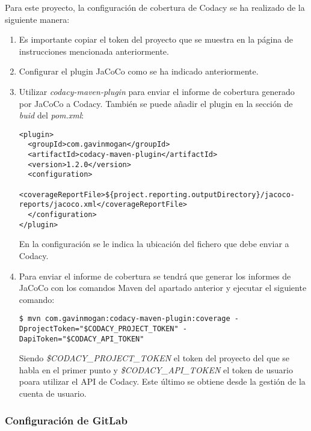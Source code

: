 Para este proyecto, la configuración de cobertura de Codacy se ha realizado de la siguiente manera:
\begin{enumerate}
	\item Es importante copiar el token del proyecto que se muestra en la página de instrucciones mencionada anteriormente. 
	
	\item Configurar el plugin JaCoCo como se ha indicado anteriormente.
	
	\item Utilizar \textit{codacy-maven-plugin} para enviar el informe de cobertura generado por JaCoCo a Codacy. También se puede añadir el plugin en la sección de \textit{buid} del \textit{pom.xml}:\\
\begin{minipage}{\linewidth}
{\tiny
\begin{lstlisting}[breaklines]
<plugin>
  <groupId>com.gavinmogan</groupId>
  <artifactId>codacy-maven-plugin</artifactId>
  <version>1.2.0</version>
  <configuration>
	<coverageReportFile>${project.reporting.outputDirectory}/jacoco-reports/jacoco.xml</coverageReportFile>
  </configuration>
</plugin>
\end{lstlisting}
}
\end{minipage}
	En la configuración se le indica la ubicación del fichero que debe enviar a Codacy.

	\item Para enviar el informe de cobertura se tendrá que generar los informes de JaCoCo con los comandos Maven del apartado anterior y ejecutar el siguiente comando:\\
\begin{minipage}{\linewidth}
{\tiny
\begin{lstlisting}[breaklines]
$ mvn com.gavinmogan:codacy-maven-plugin:coverage -DprojectToken="$CODACY_PROJECT_TOKEN" -DapiToken="$CODACY_API_TOKEN"
\end{lstlisting}
}
\end{minipage}
	Siendo \textit{\$CODACY\_PROJECT\_TOKEN} el token del proyecto del que se habla en el primer punto y \textit{\$CODACY\_API\_TOKEN} el token de usuario poara utilizar el API de Codacy. Este último se obtiene desde la gestión de la cuenta de usuario.
\end{enumerate}

\subsubsection{Configuración de GitLab}

